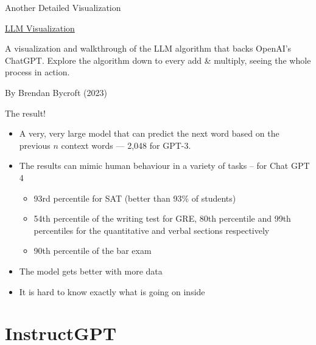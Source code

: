 \documentclass{beamer}
\begin{document}
\begin{frame}{Another Detailed Visualization}

\href{https://bbycroft.net/llm}{LLM Visualization}

A visualization and walkthrough of the LLM algorithm that backs OpenAI's ChatGPT. Explore the algorithm down to every add \& multiply, seeing the whole process in action.

By Brendan Bycroft (2023)

\end{frame}

\begin{frame}{The result!}

\begin{itemize}
\item A very, very large model that can predict the next word based on the previous $n$ context words --- 2,048 for GPT-3.
\item The results can mimic human behaviour in a variety of tasks -- for Chat GPT 4
  \begin{itemize}
  \item 93rd percentile for SAT (better than 93\% of students)
  \item 54th percentile of the writing test for GRE, 80th percentile
    and 99th percentiles for the quantitative and verbal sections
    respectively
  \item 90th percentile of the bar exam 
  \end{itemize}
\item The model gets better with more data
\item It is hard to know exactly what is going on inside
\end{itemize}
\end{frame}

\section{InstructGPT}
\end{document}
